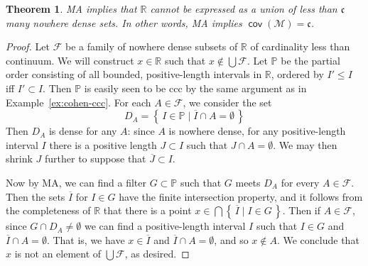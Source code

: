 \documentclass[11pt,oneside]{amsbook}
\newcommand{\set}[1]{\left\{\,#1\,\right\}}
\newcommand{\R}{\mathbb R}
\newcommand{\PP}{\mathbb P}
\newcommand{\Meager}{\mathcal M}
\DeclareMathOperator{\dom}{dom}
\DeclareMathOperator{\cov}{\mathsf{cov}}
\DeclareMathOperator{\Diff}{Diff}
\theoremstyle{definition}
\theoremstyle{plain}
\newtheorem{theorem}{Theorem}[section]
\theoremstyle{definition}
\theoremstyle{remark}
\numberwithin{equation}{section}
\numberwithin{figure}{section}
\begin{document}
\begin{theorem}
  \label{thm:ma-covm}
  MA implies that $\R$ cannot be expressed as a union of less than $\mathfrak c$ many nowhere dense sets. In other words, MA implies $\cov(\Meager)=\mathfrak c$.
\end{theorem}

\begin{proof}
  Let $\mathcal F$ be a family of nowhere dense subsets of $\R$ of cardinality less than continuum. We will construct $x\in\R$ such that $x\notin\bigcup\mathcal F$. Let $\PP$ be the partial order consisting of all bounded, positive-length intervals in $\R$, ordered by $I'\leq I$ iff $I'\subset I$. Then $\PP$ is easily seen to be ccc by the same argument as in Example~\ref{ex:cohen-ccc}. For each $A\in\mathcal F$, we consider the set
  \[D_A=\set{I\in\PP\mid \overline{I}\cap A=\emptyset}
  \]
  Then $D_A$ is dense for any $A$: since $A$ is nowhere dense, for any positive-length interval $I$ there is a positive length $J\subset I$ such that $J\cap A=\emptyset$. We may then shrink $J$ further to suppose that $\overline{J}\subset I$.

  Now by MA, we can find a filter $G\subset\PP$ such that $G$ meets $D_A$ for every $A\in\mathcal F$. Then the sets $\overline{I}$ for $I\in G$ have the finite intersection property, and it follows from the completeness of $\R$ that there is a point $x\in\bigcap\set{\overline{I}\mid I\in G}$. Then if $A\in\mathcal F$, since $G\cap D_A\neq\emptyset$ we can find a positive-length interval $I$ such that $I\in G$ and $\overline{I}\cap A=\emptyset$. That is, we have $x\in\overline{I}$ and $\overline{I}\cap A=\emptyset$, and so $x\notin A$. We conclude that $x$ is not an element of $\bigcup\mathcal F$, as desired.
\end{proof}


\end{document}

